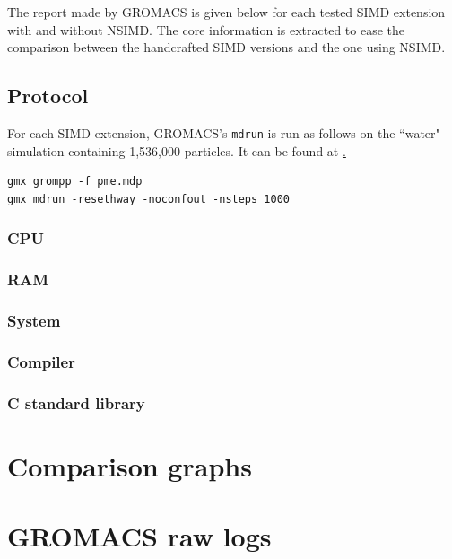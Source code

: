 \documentclass[a4paper,11pt]{article}
\newcommand{\gromacs}{GROMACS}
\newcommand{\nsimd}{NSIMD}
\begin{document}
The report made by \gromacs{} is given below for each tested SIMD extension
with and without \nsimd{}. The core information is extracted to ease the
comparison between the handcrafted SIMD versions and the one using \nsimd{}.

\subsection{Protocol}

For each SIMD extension, \gromacs{}'s \texttt{mdrun} is run as follows on
the ``water" simulation containing 1,536,000 particles. It can be found
at \href{https://ftp.gromacs.org/pub/benchmarks/water_GMX50_bare.tar.gz}.

\begin{lstlisting}
gmx grompp -f pme.mdp
gmx mdrun -resethway -noconfout -nsteps 1000
\end{lstlisting}

\subsubsection{CPU}


\subsubsection{RAM}


\subsubsection{System}


\subsubsection{Compiler}


\subsubsection{C standard library}

 
\section{Comparison graphs}


\newpage
\section{GROMACS raw logs}
\end{document}
